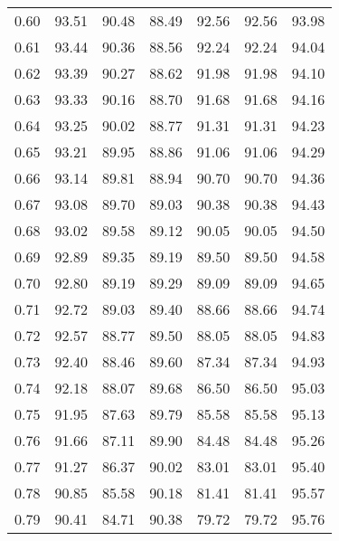 \begin{tabular}{|c|c|c|c|c|c|c|}
      0.60 &     93.51 &     90.48 &      88.49 &   92.56 &      92.56 &         93.98 \\
      0.61 &     93.44 &     90.36 &      88.56 &   92.24 &      92.24 &         94.04 \\
      0.62 &     93.39 &     90.27 &      88.62 &   91.98 &      91.98 &         94.10 \\
      0.63 &     93.33 &     90.16 &      88.70 &   91.68 &      91.68 &         94.16 \\
      0.64 &     93.25 &     90.02 &      88.77 &   91.31 &      91.31 &         94.23 \\
      0.65 &     93.21 &     89.95 &      88.86 &   91.06 &      91.06 &         94.29 \\
      0.66 &     93.14 &     89.81 &      88.94 &   90.70 &      90.70 &         94.36 \\
      0.67 &     93.08 &     89.70 &      89.03 &   90.38 &      90.38 &         94.43 \\
      0.68 &     93.02 &     89.58 &      89.12 &   90.05 &      90.05 &         94.50 \\
      0.69 &     92.89 &     89.35 &      89.19 &   89.50 &      89.50 &         94.58 \\
      0.70 &     92.80 &     89.19 &      89.29 &   89.09 &      89.09 &         94.65 \\
      0.71 &     92.72 &     89.03 &      89.40 &   88.66 &      88.66 &         94.74 \\
      0.72 &     92.57 &     88.77 &      89.50 &   88.05 &      88.05 &         94.83 \\
      0.73 &     92.40 &     88.46 &      89.60 &   87.34 &      87.34 &         94.93 \\
      0.74 &     92.18 &     88.07 &      89.68 &   86.50 &      86.50 &         95.03 \\
      0.75 &     91.95 &     87.63 &      89.79 &   85.58 &      85.58 &         95.13 \\
      0.76 &     91.66 &     87.11 &      89.90 &   84.48 &      84.48 &         95.26 \\
      0.77 &     91.27 &     86.37 &      90.02 &   83.01 &      83.01 &         95.40 \\
      0.78 &     90.85 &     85.58 &      90.18 &   81.41 &      81.41 &         95.57 \\
      0.79 &     90.41 &     84.71 &      90.38 &   79.72 &      79.72 &         95.76 \\

\end{tabular}
